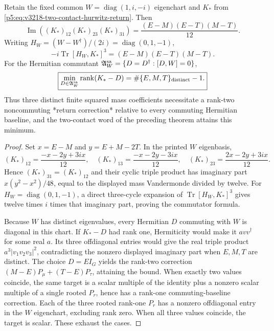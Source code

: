 \documentclass[12pt,a4paper]{article}
\begin{document}
\begin{theorem}
\label{p5:thm:v3218-minimal-return-rank}
Retain the fixed common $W=\operatorname{diag}(1,i,-i)$ eigenchart and
$K_*$ from \eqref{p5:eq:v3218-two-contact-hurwitz-return}.
Then
\begin{equation}\label{p5:eq:v3218-rooted-triangle}
 \boxed{\operatorname{Im}((K_*)_{12}(K_*)_{23}(K_*)_{31})
 =\frac{(E-M)(E-T)(M-T)}{12}.}
\end{equation}
Writing $H_W=(W-W^\dagger)/(2i)=\operatorname{diag}(0,1,-1)$,
\begin{equation}\label{p5:eq:v3218-rooted-commutator-cubic}
 \boxed{-i\operatorname{Tr}[H_W,K_*]^3
       =(E-M)(E-T)(M-T).}
\end{equation}
For the Hermitian commutant $\mathfrak A_W^{\rm sa}
=\{D=D^\dagger:[D,W]=0\}$,
\begin{equation}\label{p5:eq:v3218-rank-strata}
 \boxed{\min_{D\in\mathfrak A_W^{\rm sa}}
 \operatorname{rank}(K_*-D)
 =\#\{E,M,T\}_{\rm distinct}-1.}
\end{equation}
Thus three distinct finite squared mass coefficients necessitate a
rank-two noncommuting *return correction* relative to every commuting
Hermitian baseline, and the two-contact word of the preceding theorem
attains this minimum.
\end{theorem}
\begin{proof}
Set $x=E-M$ and $y=E+M-2T$.  In the printed $W$ eigenbasis,
\[
 (K_*)_{12}=\frac{-x-2y+3ix}{12},\quad
 (K_*)_{13}=\frac{-x-2y-3ix}{12},\quad
 (K_*)_{23}=\frac{2x-2y+3ix}{12}.
\]
Hence $(K_*)_{31}=(K_*)_{12}$ and their cyclic triple product
has imaginary part $x(y^2-x^2)/48$, equal to the displayed mass
Vandermonde divided by twelve.  For $H_W=\operatorname{diag}(0,1,-1)$,
a direct three-cycle expansion of $\operatorname{Tr}[H_W,K_*]^3$
gives twelve times $i$ times that imaginary part, proving the
commutator formula.

Because $W$ has distinct eigenvalues, every Hermitian $D$ commuting
with $W$ is diagonal in this chart.  If $K_*-D$ had rank one,
Hermiticity would make it $a vv^\dagger$ for some real $a$.
Its three offdiagonal entries would give the real triple product
$a^3|v_1v_2v_3|^2$, contradicting the nonzero displayed imaginary
part when $E,M,T$ are distinct.  The choice $D=E I_G$ yields the
rank-two correction $(M-E)P_\mu+(T-E)P_\tau$, attaining the bound.
When exactly two values coincide, the same target is a scalar
multiple of the identity plus a nonzero scalar multiple of a single
rooted $P_r$, hence has a rank-one commuting-baseline correction.
Each of the three rooted rank-one $P_r$ has a nonzero offdiagonal
entry in the $W$ eigenchart, excluding rank zero.  When all three
values coincide, the target is scalar.  These exhaust the cases.
\end{proof}
\end{document}

